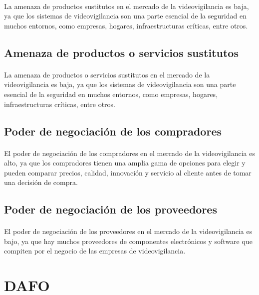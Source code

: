 \documentclass{report}
\begin{document}
          \paragraph*{}{La amenaza de productos sustitutos en el mercado de la videovigilancia es baja, ya que los sistemas de videovigilancia son una parte esencial de la seguridad en muchos entornos, como empresas, hogares, infraestructuras críticas, entre otros.}
        \subsection*{Amenaza de productos o servicios sustitutos}
          \paragraph*{}{La amenaza de productos o servicios sustitutos en el mercado de la videovigilancia es baja, ya que los sistemas de videovigilancia son una parte esencial de la seguridad en muchos entornos, como empresas, hogares, infraestructuras críticas, entre otros.}
        \subsection*{Poder de negociación de los compradores}
          \paragraph*{}{El poder de negociación de los compradores en el mercado de la videovigilancia es alto, ya que los compradores tienen una amplia gama de opciones para elegir y pueden comparar precios, calidad, innovación y servicio al cliente antes de tomar una decisión de compra.}
        \subsection*{Poder de negociación de los proveedores}
          \paragraph*{}{El poder de negociación de los proveedores en el mercado de la videovigilancia es bajo, ya que hay muchos proveedores de componentes electrónicos y software que compiten por el negocio de las empresas de videovigilancia.}
      \clearpage\section{DAFO}
\end{document}
